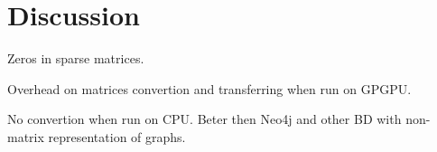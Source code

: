 \section{Discussion}

Zeros in sparse matrices.

Overhead on matrices convertion and transferring when run on GPGPU.

No convertion when run on CPU. Beter then Neo4j and other BD with non-matrix representation of graphs.

